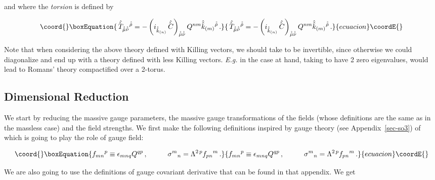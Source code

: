 \documentclass[12pt,a4paper]{article}
\begin{document}
\noindent and where the {\em torsion} is defined by

\begin{equation}\coord{}\boxEquation{
\hat{\hat{T}\,}_{\hat{\hat{\mu}}\hat{\hat{\nu}}}{}^{\hat{\hat{\rho}}}
= -\left(i_{\hat{\hat{k}}_{(n)}}\hat{\hat{C}\,}
\right)_{\hat{\hat{\mu}}\hat{\hat{\nu}}} Q^{nm}
\hat{\hat{k}}_{(m)}{}^{\hat{\hat{\rho}}}\, .
}{
\hat{\hat{T}\,}_{\hat{\hat{\mu}}\hat{\hat{\nu}}}{}^{\hat{\hat{\rho}}}
= -\left(i_{\hat{\hat{k}}_{(n)}}\hat{\hat{C}\,}
\right)_{\hat{\hat{\mu}}\hat{\hat{\nu}}} Q^{nm}
\hat{\hat{k}}_{(m)}{}^{\hat{\hat{\rho}}}\, .
}{ecuacion}\coordE{}\end{equation}

Note that when considering the above theory defined with \coordHE{} Killing
vectors, we should take \coordHE{} to be invertible, since otherwise we could
diagonalize \coordHE{} and end up with a theory defined with less Killing
vectors. {\em E.g.} in the case at hand, taking \coordHE{} to have 2 zero
eigenvalues, would lead to Romans' theory compactified over a 2-torus.

\subsection{Dimensional Reduction}

We start by reducing the massive gauge parameters, the massive gauge
transformations of the fields (whose definitions are the same as in
the massless case) and the field strengths.  We first make the
following definitions inspired by \coordHE{} gauge theory (see
Appendix~\ref{sec-so3}) of which \coordHE{} is going to play the role
of gauge field:


\begin{equation}\coord{}\boxEquation{
f_{mn}{}^{p}\equiv\epsilon_{mnq}Q^{qp}\, ,
\hspace{1cm}
\sigma^{m}{}_{n} = \Lambda^{2\, p}f_{pn}{}^{m}\, .
}{
f_{mn}{}^{p}\equiv\epsilon_{mnq}Q^{qp}\, ,
\hspace{1cm}
\sigma^{m}{}_{n} = \Lambda^{2\, p}f_{pn}{}^{m}\, .
}{ecuacion}\coordE{}\end{equation}

\noindent We are also going to use the definitions of \coordHE{}
gauge covariant derivative that can be found in that appendix.  We get
\end{document}
